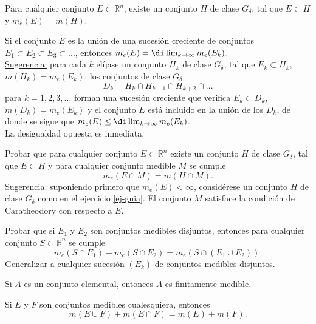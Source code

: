 \documentclass{book}
\newcommand{\rr}{\mathbb{R}}
\begin{document}
	
  \begin{ejer} {}
	\label{ej-guia}
  Para cualquier conjunto $E \subset \rr^n$, existe un conjunto $H$ de clase $G_{\delta}$,
  tal que $E \subset H$ y $m_e(E)=m(H)$.
	\end{ejer} 

  \begin{ejer} {}
  Si el conjunto $E$ es la unión de una sucesión creciente de conjuntos 
  $E_1\subset E_2\subset E_3\subset...$, entonces 
  $ m_e(E)=\di\lim_{k\rightarrow \infty} m_e(E_k).$
  \\
  \underline{Sugerencia:} para cada $k$ elíjase un conjunto $H_k$ de clase $G_{\delta}$,
  tal que $E_k\subset H_k$, $m(H_k)=m_e(E_k)$; los conjuntos de clase $G_{\delta}$
  $$D_k=H_k\cap H_{k+1}\cap H_{k+2}\cap... $$
  para $k=1,2,3,...$ forman una sucesión creciente que verifica $E_k \subset D_k$,
  $m(D_k)=m_e(E_k)$ y el conjunto $E$ está incluido en la unión de los $D_k$, de donde
  se sigue que $m_e(E)\leq \di\lim_{k\rightarrow \infty} m_e(E_k)$.
  \\
  La desigualdad opuesta es inmediata.
 \end{ejer}


  \begin{ejer}{}
	Probar que para cualquier  conjunto $E \subset \rr^n$ existe un conjunto $H$ de
  clase $G_{\delta}$, tal que $E \subset H$ y para cualquier conjunto medible $M$ se cumple
  $$m_e(E \cap M)=m(H\cap M).$$
  \underline{Sugerencia:} suponiendo primero que $m_e(E)<\infty$, considérese un conjunto
  $H$ de clase $G_{\delta}$ como en el ejercicio \ref{ej-guia}. El conjunto $M$ satisface la
  condición de Caratheodory con respecto a $E$.
   \end{ejer} 

   \begin{ejer}{}
	Probar que si $E_1$ y $E_2$ son conjuntos medibles disjuntos, entonces para cualquier
  conjunto $S \subset \rr^n$ se cumple 
  $$m_e(S\cap E_1)+m_e(S\cap E_2)=m_e(S\cap(E_1\cup E_2)). $$
  Generalizar a cualquier sucesión $(E_k)$ de conjuntos medibles disjuntos.
   \end{ejer} 

 \begin{ejer}{} 
   Si $A$ es un conjunto elemental, entonces $A$ es finitamente medible.
	\end{ejer} 
	
	 \begin{ejer}{} 
 Si $E$ y $F$ son conjuntos medibles cualesquiera, entonces
  $$m(E \cup F)+m(E \cap F)=m(E)+m(F).$$
	\end{ejer} 
\end{document}
